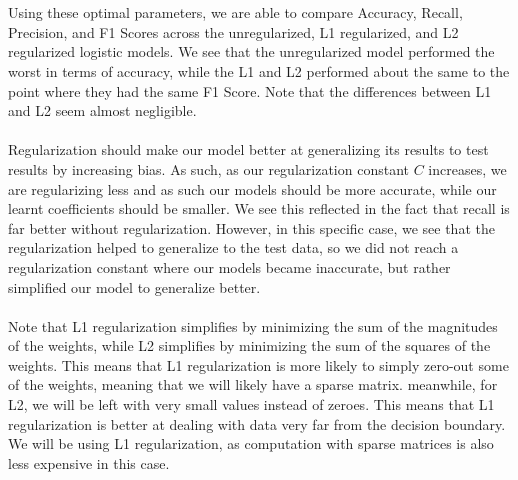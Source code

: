 \documentclass[11pt]{article}
\begin{document}
\begin{multicols}{2}
\\\\
Using these optimal parameters, we are able to compare Accuracy, Recall, Precision, and F1 Scores across the unregularized, L1 regularized, and L2 regularized logistic models. We see that the unregularized model performed the worst in terms of accuracy, while the L1 and L2 performed about the same to the point where they had the same F1 Score. Note that the differences between L1 and L2 seem almost negligible. \\\\
Regularization should make our model better at generalizing its results to test results by increasing bias. As such, as our regularization constant $C$ increases, we are regularizing less and as such our models should be more accurate, while our learnt coefficients should be smaller. We see this reflected in the fact that recall is far better without regularization. However, in this specific case, we see that the regularization helped to generalize to the test data, so we did not reach a regularization constant where our models became inaccurate, but rather simplified our model to generalize better. 
\\\\
Note that L1 regularization simplifies by minimizing the sum of the magnitudes of the weights, while L2 simplifies by minimizing the sum of the squares of the weights. This means that L1 regularization is more likely to simply zero-out some of the weights, meaning that we will likely have a sparse matrix. meanwhile, for L2, we will be left with very small values instead of zeroes. This means that L1 regularization is better at dealing with data very far from the decision boundary. We will be using L1 regularization, as computation with sparse matrices is also less expensive in this case. 
\\\\

\end{multicols}
\end{document}
